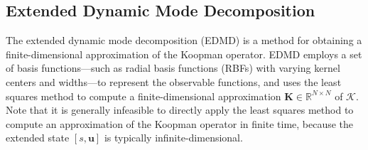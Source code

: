 \documentclass[pdflatex,sn-mathphys,Numbered]{sn-jnl}
\numberwithin{equation}{section}
\begin{document}
\subsection{Extended Dynamic Mode Decomposition}

The extended dynamic mode decomposition (EDMD) is a method for obtaining a finite-dimensional approximation of the Koopman operator. EDMD employs a set of basis functions—such as radial basis functions (RBFs) with varying kernel centers and widths—to represent the observable functions, and uses the least squares method to compute a finite-dimensional approximation $\mathbf{K} \in \mathbb{R}^{N \times N}$ of $\mathcal{K}$. Note that it is generally infeasible to directly apply the least squares method to compute an approximation of the Koopman operator in finite time, because the extended state $[s, \mathbf{u}]$ is typically infinite-dimensional.
\end{document}
